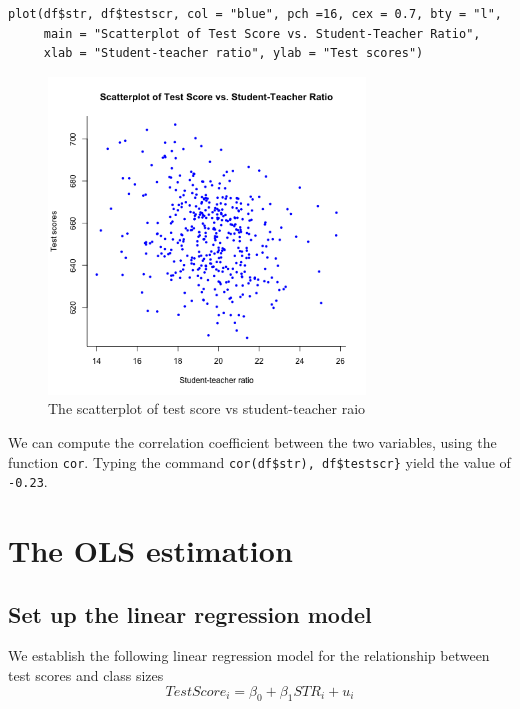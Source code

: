 \documentclass[11pt]{article}
\begin{document}
\begin{verbatim}
plot(df$str, df$testscr, col = "blue", pch =16, cex = 0.7, bty = "l",
     main = "Scatterplot of Test Score vs. Student-Teacher Ratio",
     xlab = "Student-teacher ratio", ylab = "Test scores")
\end{verbatim}

\begin{figure}[htbp]
\centering
\includegraphics[width=0.75\textwidth]{fig42.png}
\caption{\label{fig:orga544336}
The scatterplot of test score vs student-teacher raio}
\end{figure}

We can compute the correlation coefficient
between the two variables, using the function \texttt{cor}. Typing the
command \texttt{cor(df\$str), df\$testscr\}} yield the value of
\texttt{-0.23}.


\section{The OLS estimation}
\label{sec:orge87ed43}

\subsection{Set up the linear regression model}
\label{sec:orgae553ce}

We establish the following linear regression model for the relationship between
test scores and class sizes
\begin{equation}
\label{eq:testscr-str-1}
TestScore_i = \beta_0 + \beta_1 STR_i + u_i
\end{equation}
\end{document}
